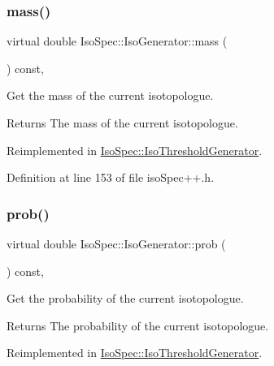 \subsubsection{\texorpdfstring{mass()}{mass()}}
{\footnotesize\ttfamily virtual double Iso\+Spec\+::\+Iso\+Generator\+::mass (\begin{DoxyParamCaption}{ }\end{DoxyParamCaption}) const\hspace{0.3cm}{\ttfamily [inline]}, {\ttfamily [virtual]}}



Get the mass of the current isotopologue. 

\begin{DoxyReturn}{Returns}
The mass of the current isotopologue. 
\end{DoxyReturn}


Reimplemented in \mbox{\hyperlink{class_iso_spec_1_1_iso_threshold_generator_ae2236accc7dc7a25a723e3c7317659b6}{Iso\+Spec\+::\+Iso\+Threshold\+Generator}}.



Definition at line 153 of file iso\+Spec++.\+h.

\mbox{\label{class_iso_spec_1_1_iso_generator_aecf1b3292fcc0857a86efe619a37fff0}} 
\subsubsection{\texorpdfstring{prob()}{prob()}}
{\footnotesize\ttfamily virtual double Iso\+Spec\+::\+Iso\+Generator\+::prob (\begin{DoxyParamCaption}{ }\end{DoxyParamCaption}) const\hspace{0.3cm}{\ttfamily [inline]}, {\ttfamily [virtual]}}



Get the probability of the current isotopologue. 

\begin{DoxyReturn}{Returns}
The probability of the current isotopologue. 
\end{DoxyReturn}


Reimplemented in \mbox{\hyperlink{class_iso_spec_1_1_iso_threshold_generator_a998d987f81b2ca7ed610294f6a5f8df5}{Iso\+Spec\+::\+Iso\+Threshold\+Generator}}.



